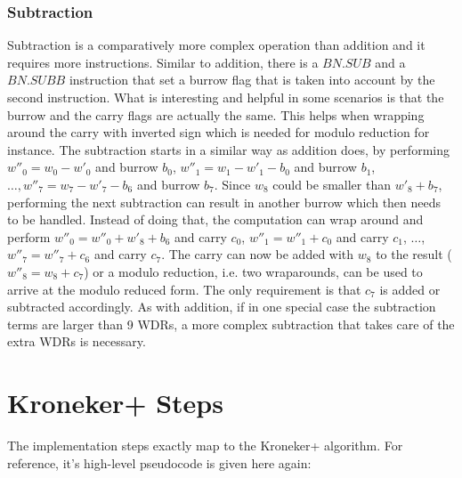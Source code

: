 \subsubsection{Subtraction}

Subtraction is a comparatively more complex operation than addition and it requires more instructions. Similar to addition, there is a $BN.SUB$ and a $BN.SUBB$ instruction that set a burrow flag that is taken into account by the second instruction. What is interesting and helpful in some scenarios is that the burrow and the carry flags are actually the same. This helps when wrapping around the carry with inverted sign which is needed for modulo reduction for instance. The subtraction starts in a similar way as addition does, by performing $w''_0 = w_0 - w'_0$ and burrow $b_0$, $w''_1 = w_1 - w'_1 - b_0$ and burrow $b_1$, $\ldots, w''_7 = w_7 - w'_7 - b_6$ and burrow $b_7$. Since $w_8$ could be smaller than $w'_8 + b_7$, performing the next subtraction can result in another burrow which then needs to be handled. Instead of doing that, the computation can wrap around and perform $w''_0 = w''_0 + w'_8 + b_6$ and carry $c_0$, $w''_1 = w''_1 + c_0$ and carry $c_1$, $\ldots$, $w''_7 = w''_7 + c_6$ and carry $c_7$. The carry can now be added with $w_8$ to the result ($w''_8 = w_8 + c_7$) or a modulo reduction, i.e. two wraparounds, can be used to arrive at the modulo reduced form. The only requirement is that $c_7$ is added or subtracted accordingly. As with addition, if in one special case the subtraction terms are larger  than 9 WDRs, a more complex subtraction that takes care of the extra WDRs is necessary.


\section{Kroneker+ Steps}

The implementation steps exactly map to the Kroneker+ algorithm. For reference, it's high-level pseudocode is given here again:

